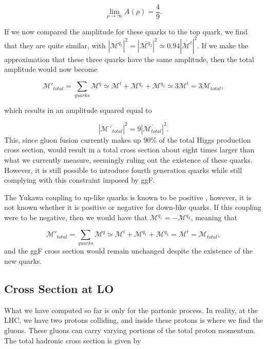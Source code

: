 \documentclass[EPJ,twocolumn]{webofc}
\begin{document}
\begin{equation}
    \lim_{\rho\rightarrow\infty} A\left(\rho\right) = \frac{4}{9}.
\end{equation}

If we now compared the amplitude for these quarks to the top quark, we find that they are quite similar, with $|\overline{\mathcal{M}^{q_1}}|^2 = |\overline{\mathcal{M}^{q_2}}|^2  \simeq 0.94|\overline{\mathcal{M}^t}|^2$. If we make the approximation that these three quarks have the same amplitude, then the total amplitude would now become

\begin{equation}
    \mathcal{M}'_{total} =  \sum_{quarks} \mathcal{M}^q \simeq \mathcal{M}^t+\mathcal{M}^{q_1}+\mathcal{M}^{q_2}\simeq 3\mathcal{M}^t = 3\mathcal{M}_{total},
\end{equation}

which results in an amplitude squared equal to

\begin{equation}
     |\overline{\mathcal{M}´_{total}}|^2 =  9|\overline{\mathcal{M}_{total}}|^2.
\end{equation}
This, since gluon fusion currently makes up $90$\% of the total Higgs production cross section, would result in a total cross section  about eight times larger than what we currently measure, seemingly ruling out the existence of these quarks. However, it is still possible to introduce fourth generation quarks while still complying with this constraint imposed by ggF.

The Yukawa coupling to up-like quarks is known to be positive \cite{Cheung_2019} , however, it is not known whether it is positive or negative for down-like quarks. If this coupling were to be negative, then we would have that $\mathcal{M}^{q_1} = -\mathcal{M}^{q_2}$, meaning that 

\begin{equation}
    \mathcal{M}'_{total} =  \sum_{quarks} \mathcal{M}^q \simeq      \mathcal{M}^t+\mathcal{M}^{q_1}+\mathcal{M}^{q_2}= \mathcal{M}^t =    \mathcal{M}_{total},
\end{equation}
and the ggF cross section would remain unchanged despite the existence of the new quarks.

\subsection{Cross Section at LO}

What we have computed so far is only for the partonic process. In reality, at the LHC, we have two protons colliding, and inside these protons is where we find the gluons. These gluons can carry varying portions of the total proton momentum. The total hadronic cross section is given by
\end{document}
